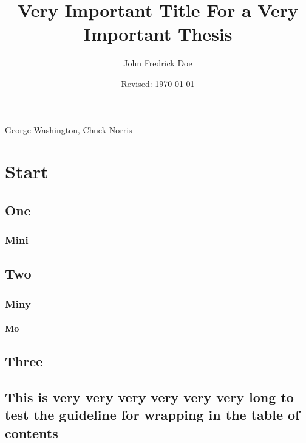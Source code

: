 \documentclass{utthesis}
\begin{document}
\author{John Fredrick Doe} 
\title{Very Important Title For a Very Important Thesis} 
\date{Revised: \today}

\UTcopyrightlegend %

\begin{UTcommittee}
\end{UTcommittee}


\frontmatter

\setcounter{page}{4}

%
%

\begin{UTabstract}[S]{George Washington, Chuck Norris}
\lipsum[1]
\end{UTabstract}


\tableofcontents

\listoffigures

\mainmatter

\chapter{Start}
\lipsum[3]
\section{One}
\subsection{Mini}
\section{Two}
\subsection{Miny}
\subsubsection{Mo}
\section{Three}
\section{This is very very very very very very long to test the guideline for wrapping in the table of contents}
\end{document}

